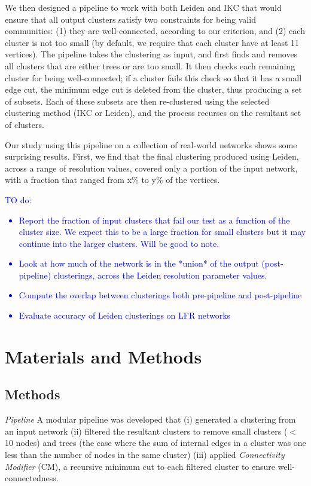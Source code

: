 \documentclass[12pt, oneside]{article}   	%
\begin{document}
We then designed a pipeline to work with both Leiden and IKC that would ensure that all output clusters satisfy two constraints for being valid communities: (1) they are well-connected, according to our criterion, and (2) each cluster is not too small (by default, we require that each cluster have at least 11 vertices).
The pipeline takes the clustering as input, and first finds and removes all clusters that are either trees or are too small.  It then checks each remaining cluster for being well-connected; if a cluster
fails this check so that it has a small edge cut, the minimum edge cut is deleted from the cluster, thus producing a set of subsets.  Each of these subsets are then re-clustered using the selected clustering
method (IKC or Leiden), and the process recurses on the resultant set of clusters.

Our study using this pipeline on a collection of real-world networks shows some surprising results.
First, we find that the final clustering produced using Leiden, across a range of resolution values, 
covered only a portion of the input network, with a  fraction that ranged from x\% to y\% of the vertices.

\textcolor{blue}{TO do:
\begin{itemize}
\item Report the fraction of input clusters that fail our test as a function of the cluster size.
We expect this to be a large fraction for small clusters but it may continue into the larger clusters.
Will be good to note.
\item Look at how much of the network is in the *union* of the output (post-pipeline) clusterings, across the Leiden resolution parameter values.
\item Compute the overlap between clusterings both pre-pipeline and post-pipeline
\item  Evaluate accuracy of Leiden clusterings on LFR networks 
\end{itemize}
}

\section{Materials and Methods}

\subsection{Methods} 
\emph{Pipeline} A modular pipeline was developed that (i) generated a clustering from an input network (ii) filtered the resultant clusters to remove small clusters ($<$ 10 nodes) and trees (the case where the sum of internal edges in a cluster was one less than the number of nodes in the same cluster) (iii) applied \emph{Connectivity Modifier} (CM), a recursive minimum cut to each filtered cluster to ensure well-connectedness.
\end{document}
